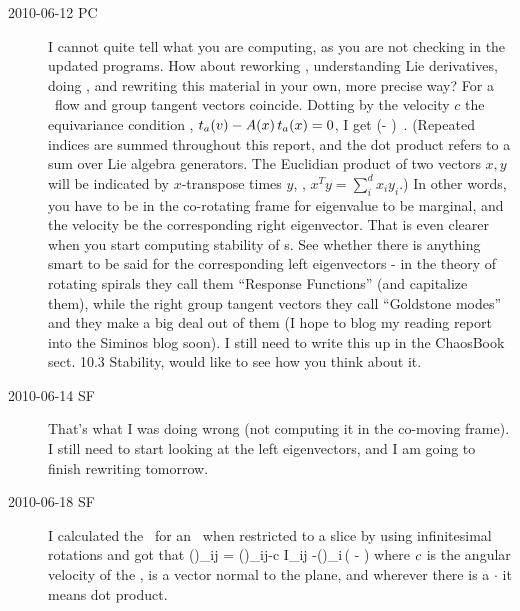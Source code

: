 \begin{description}
\item[2010-06-12 PC]
I cannot quite tell what you are computing, as you are not
checking in the updated programs.
How about reworking ,
understanding Lie derivatives,
doing ,
and rewriting this material in your own, more precise way?
For a \reqv\ flow and group tangent vectors coincide.
Dotting by the velocity $c$
the
equivariance condition ,
$
t_a(v)  - A(x) \, t_a(x) =0
$,
I get
\beq
(\velRel \cdot \Lg - \Mvar ) 
\,.
(Repeated indices are summed throughout this
report, and the dot product refers to a sum over
Lie algebra generators. The Euclidian product of two vectors
$x,y$ will be indicated by $x$-transpose times $y$, \ie,
$x^T y = \sum_i^d x_i y_i$.)
In other words, you have to be in the co-rotating
frame for eigenvalue to be marginal, and the velocity
be the corresponding right eigenvector. That is even
clearer when you start computing stability of \rpo s.
See whether there is anything smart to be said for the
corresponding left eigenvectors - in the theory of
rotating spirals they call them
``Response Functions'' (and capitalize them), while the
right group tangent vectors they call ``Goldstone
modes'' and they make a big deal out of them
(I hope to blog my reading report into
the Siminos blog soon). I still need to write this
up in the ChaosBook sect. 10.3 Stability, would like
to see how you think about it.

\item[2010-06-14 SF]
That's what I was doing wrong (not computing it in the co-moving frame). I still need to start looking at the left eigenvectors, and I am going to finish rewriting  tomorrow.

\item[2010-06-18 SF]
I calculated the \stabmat\ for an \reqv\ when restricted to a slice by using infinitesimal rotations and got that
\beq
{\MvarRed}(\sspRed)_{ij} = \Mvar(\sspRed)_{ij}-c I_{ij}
     -\groupTan(\sspRed)_i\,\left(
     - \velRel {}
              \right)
where $c$ is the angular velocity of the \reqv, \sliceTan{} is a vector normal to the plane, and wherever there is a $\cdot$ it means dot product.


\end{description}
